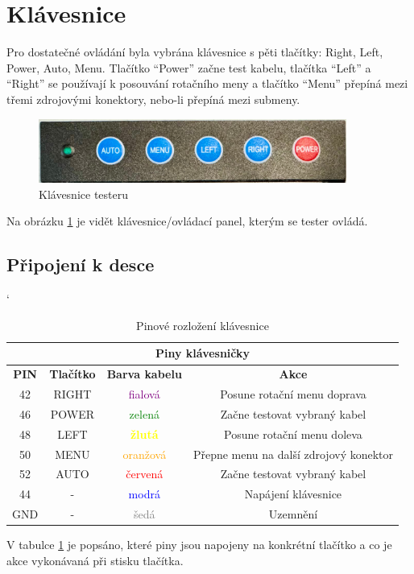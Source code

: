 
\section{Klávesnice}
Pro dostatečné ovládání byla vybrána klávesnice s pěti tlačítky: Right, Left, Power, Auto, Menu. Tlačítko “Power” začne test kabelu, tlačítka “Left” a “Right” se používají k posouvání rotačního meny a tlačítko “Menu” přepíná mezi třemi zdrojovými konektory, nebo-li přepíná mezi submeny.

\begin{figure}[H]
	\centering
	\includegraphics[width=0.9\textwidth]{pictures/keyboard.jpeg}
    	\caption{Klávesnice testeru}
   	\label{fig:keyborad}
\end{figure}

Na obrázku \ref{fig:keyborad} je vidět klávesnice/ovládací panel, kterým se tester ovládá.

\subsection*{Připojení k desce}
\begin{table} [h!]
	\caption{Pinové rozložení klávesnice}
	\label{table:pinKB}
	\centering
	\catcode` %
	\begin{tabular}[c]{|| c | c | c | c ||}
	\hline
		\multicolumn{4}{||c||}{Piny klávesničky} \\
	\hline
		\textbf{PIN} & \textbf{Tlačítko} & \textbf{Barva kabelu} & \textbf{Akce}\\
	\hline
		42 &  RIGHT & \textcolor{purple}{fialová} & Posune rotační menu doprava\\
	\hline
		46 & POWER & \textcolor{green}{zelená} & Začne testovat vybraný kabel\\
	\hline
		48 & LEFT & \textcolor{yellow}{\textbf{žlutá}} & Posune rotační menu doleva\\
	\hline
		50 & MENU & \textcolor{orange}{oranžová} & Přepne menu na další zdrojový konektor \\
	\hline
		52 & AUTO & \textcolor{red}{červená} & Začne testovat vybraný kabel\\
	\hline
		44 & - & \textcolor{blue}{modrá} & Napájení klávesnice\\
	\hline
		GND & - & \textcolor{gray}{šedá} & Uzemnění\\
	\hline
	\end{tabular}
\end{table}

V tabulce  \ref{table:pinKB} je popsáno, které piny jsou napojeny na konkrétní tlačítko a co je akce vykonávaná při stisku tlačítka.
